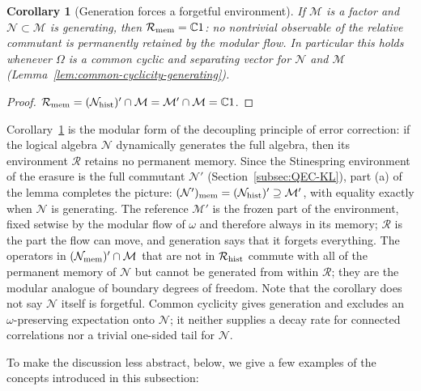 \documentclass[a4paper,11pt]{article}
\newtheorem{corollary}[theorem]{Corollary}
\theoremstyle{definition}
\begin{document}
\begin{corollary}[Generation forces a forgetful environment]\label{cor:generating-forgetful}
If $\mathcal M$ is a factor and $\mathcal N\subset\mathcal M$ is generating, then $\mathcal R_{\rm mem}=\mathbb C1$: no nontrivial observable of the relative commutant is permanently retained by the modular flow. In particular this holds whenever $\Omega$ is a common cyclic and separating vector for $\mathcal N$ and $\mathcal M$ {\rm(Lemma~\ref{lem:common-cyclicity-generating})}.
\end{corollary}
\begin{proof}
$\mathcal R_{\rm mem}=(\mathcal N_{\rm hist})'\cap\mathcal M=\mathcal M'\cap\mathcal M=\mathbb C1$.
\end{proof}

Corollary~\ref{cor:generating-forgetful} is the modular form of the decoupling principle of error correction: if the logical algebra $\mathcal N$ dynamically generates the full algebra, then its environment $\mathcal R$ retains no permanent memory. Since the Stinespring environment of the erasure is the full commutant $\mathcal N'$ (Section~\ref{subsec:QEC-KL}), part (a) of the lemma completes the picture: $(\mathcal N')_{\rm mem}=(\mathcal N_{\rm hist})'\supseteq\mathcal M'$, with equality exactly when $\mathcal N$ is generating. The reference $\mathcal M'$ is the frozen part of the environment, fixed setwise by the modular flow of $\omega$ and therefore always in its memory; $\mathcal R$ is the part the flow can move, and generation says that it forgets everything. The operators in $(\mathcal N_{\rm mem})'\cap\mathcal M$ that are not in $\mathcal R_{\rm hist}$ commute with all of the permanent memory of $\mathcal N$ but cannot be generated from within $\mathcal R$; they are the modular analogue of boundary degrees of freedom. Note that the corollary does not say $\mathcal N$ itself is forgetful. Common cyclicity gives generation and excludes an $\omega$-preserving expectation onto $\mathcal N$; it neither supplies a decay rate for connected correlations nor a trivial one-sided tail for $\mathcal N$.

To make the discussion less abstract, below, we give a few examples of the concepts introduced in this subsection:
\end{document}
